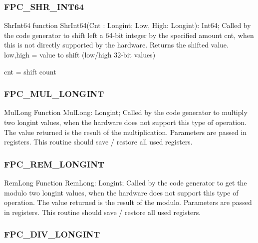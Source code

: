 \documentclass [12pt]{article}
\begin{document}
\subsubsection{FPC{\_}SHR{\_}INT64}
\label{subsubsec:mylabel102}

\begin{function}{ShrInt64}
\Declaration
function ShrInt64(Cnt : Longint; Low, High: Longint): Int64;
\Description 
Called by the code generator to shift left a 64-bit integer by the specified
amount cnt, when this is not directly supported by the hardware. Returns the
shifted value.
\Parameters 
low,high = value to shift (low/high 32-bit values) \par
cnt = shift count 
\end{function}

\subsubsection{FPC{\_}MUL{\_}LONGINT}
\label{subsubsec:mylabel103}

\begin{function}{MulLong}
\Declaration
Function MulLong: Longint;
\Description 
Called by the code generator to multiply two longint values, when the hardware does not support this type of operation. The value returned is the result of the multiplication. 
\Parameters 
Parameters are passed in registers. 
\Notes 
This routine should save / restore all used registers. 
\end{function}

\subsubsection{FPC{\_}REM{\_}LONGINT}
\label{subsubsec:mylabel104}

\begin{function}{RemLong}
\Declaration
Function RemLong: Longint;
\Description 
Called by the code generator to get the modulo two longint values, when the
hardware does not support this type of operation. The value returned is the
result of the modulo.
\Parameters 
Parameters are passed in registers. 
\Notes 
This routine should save / restore all used registers. 
\end{function}

\subsubsection{FPC{\_}DIV{\_}LONGINT}
\label{subsubsec:mylabel105}
\end{document}
